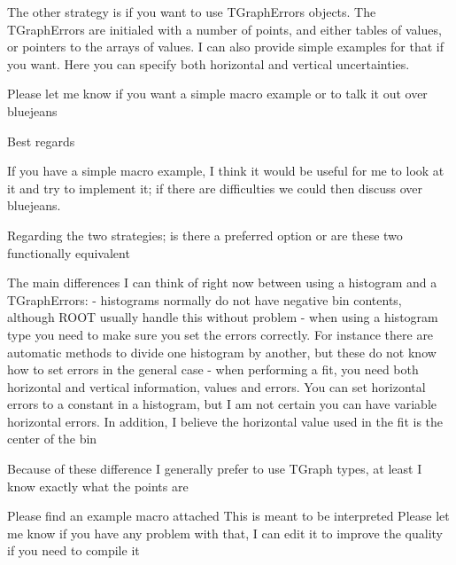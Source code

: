 The other strategy is if you want to use TGraphErrors objects. The TGraphErrors are initialed with a number of points, and either tables of values, or pointers to the arrays of values. I can also provide simple examples for that if you want. Here you can specify both horizontal and vertical uncertainties.

Please let me know if you want a simple macro example or to talk it out over bluejeans

Best regards

If you have a simple macro example, I think it would be useful for me to look at it and try to implement it; if there are difficulties we could then discuss over bluejeans.

Regarding the two strategies; is there a preferred option or are these two functionally equivalent


The main differences I can think of right now between using a histogram and a TGraphErrors:
- histograms normally do not have negative bin contents, although ROOT usually handle this without problem
- when using a histogram type you need to make sure you set the errors correctly. For instance there are automatic methods to divide one histogram by another, but these do not know how to set errors in the general case
- when performing a fit, you need both horizontal and vertical information, values and errors. You can set horizontal errors to a constant in a histogram, but I am not certain you can have variable horizontal errors. In addition, I believe the horizontal value used in the fit is the center of the bin

Because of these difference I generally prefer to use TGraph types, at least I know exactly what the points are

Please find an example macro attached
This is meant to be interpreted
Please let me know if you have any problem with that, I can edit it to improve the quality if you need to compile it